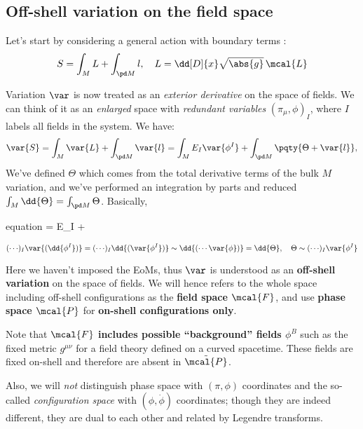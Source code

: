 \documentclass[a4paper
	,10pt
]{article}
\begin{document}
\subsection{Off-shell variation on the field space}
	\noindent
	Let's start by considering a general action with boundary terms \cite{Harlow:2019yfa}:
	\begin{equation}
		S = \int_M L + \int_{\pd M} l,
	\quad
		L = \dd[D]{x} \sqrt{\abs{g}}\,\mcal{L}
	\end{equation}
	
	Variation $\var$ is now treated as an \textit{exterior derivative} on the space of fields. We can think of it as an \textit{enlarged} space with \textit{redundant variables} $(\pi_\mu,\phi)_I$, where $I$ labels all fields in the system. We have:
	\begin{equation}
		\var{S}
		= \int_M \var{L}
			+ \int_{\pd M} \var{l}
		= \int_M E_I \var{\phi^I}
			+ \int_{\pd M} \pqty{\Theta + \var{l}},
	\end{equation}
	We've defined $\Theta$ which comes from the total derivative terms of the bulk $M$ variation, and we've performed an integration by parts and reduced $\int_M \dd{\Theta} = \int_{\pd M} \Theta$. Basically,
	\begin{empheq}{equation}
		= E_I  + \dd{\Theta}
	\end{empheq}
	\vspace{-.3\baselineskip}
	\begin{equation}
		({\cdots})_I \var{(\dd{\phi^I})}
		= ({\cdots})_I \dd{(\var{\phi^I})}
		\sim \dd{(\cdots \var{\phi})}
		= \dd{\Theta},
	\quad
		\Theta \sim ({\cdots})_I \var{\phi^I}
	\end{equation}
	
	Here we haven't imposed the EoMs, thus $\var$ is understood as an \textbf{off-shell variation} on the space of fields. We will hence refers to the whole space including off-shell configurations as the \textbf{field space $\mcal{F}$}, and use \textbf{phase space $\mcal{P}$} for \textbf{on-shell configurations only}. 
	
	Note that $\mcal{F}$ \textbf{includes possible ``background'' fields $\phi^B$} such as the fixed metric $g^{\mu\nu}$ for a field theory defined on a curved spacetime. These fields are fixed on-shell and therefore are absent in $\tilde{\mcal{P}}$. 
	
	Also, we will \textit{not} distinguish phase space with $(\pi,\phi) $ coordinates and the so-called \textit{configuration space} with $(\phi,\dot{\phi})$ coordinates; though they are indeed different, they are dual to each other and related by Legendre transforms. 
	
\end{document}
